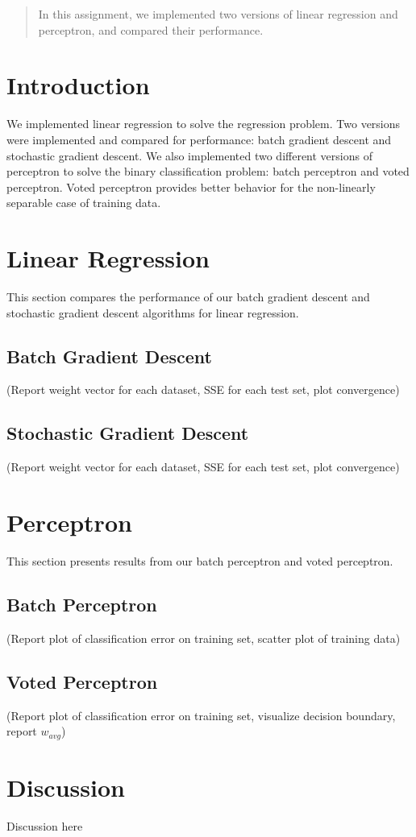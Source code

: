 \documentclass[12pt]{article}
\begin{document}
\maketitle

\begin{abstract}
In this assignment, we implemented two versions of linear regression and perceptron, and compared their performance.
\end{abstract}

\section{Introduction}
We implemented linear regression to solve the regression problem. Two versions were implemented and compared for performance: batch gradient descent and stochastic gradient descent. We also implemented two different versions of perceptron to solve the binary classification problem: batch perceptron and voted perceptron. Voted perceptron provides better behavior for the non-linearly separable case of training data.

\section{Linear Regression}
This section compares the performance of our batch gradient descent and stochastic gradient descent algorithms for linear regression.

\subsection{Batch Gradient Descent}
(Report weight vector for each dataset, SSE for each test set, plot convergence)

\subsection{Stochastic Gradient Descent}
(Report weight vector for each dataset, SSE for each test set, plot convergence)

\section{Perceptron}
This section presents results from our batch perceptron and voted perceptron.

\subsection{Batch Perceptron}
(Report plot of classification error on training set, scatter plot of training data)

\subsection{Voted Perceptron}
(Report plot of classification error on training set, visualize decision boundary, report \(w_{avg}\))

\section{Discussion}
Discussion here
\end{document}
